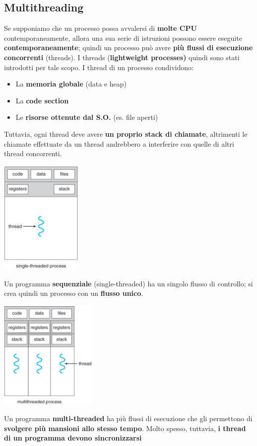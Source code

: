 \documentclass[12pt]{article}
\begin{document}
\subsection{Multithreading}
Se supponiamo che un processo possa avvalersi di \textbf{molte CPU} contemporaneamente, allora una sua serie di istruzioni possono essere eseguite \textbf{contemporaneamente}; quindi un processo può avere \textbf{più flussi di esecuzione concorrenti} (threads). I threads (\textbf{lightweight processes)} quindi sono stati introdotti per tale scopo. I thread di un processo condividono:
\begin{itemize}
    \item La \textbf{memoria globale} (data e heap)
    \item La \textbf{code section}
    \item Le \textbf{risorse ottenute dal S.O.} (es. file aperti)
\end{itemize}
Tuttavia, ogni thread deve avere \textbf{un proprio stack di chiamate}, altrimenti le chiamate effettuate da un thread andrebbero a interferire con quelle di altri thread concorrenti.
\begin{center}
    \includegraphics[width = 0.30\textwidth]{Images/60.PNG}
\end{center}
Un programma \textbf{sequenziale} (single-threaded) ha un singolo flusso di controllo; si crea quindi un processo con un \textbf{flusso unico}.
\begin{center}
    \includegraphics[width = 0.35\textwidth]{Images/61.PNG}
\end{center}
Un programma \textbf{multi-threaded} ha più flussi di esecuzione che gli permettono di \textbf{svolgere più mansioni allo stesso tempo}. Molto spesso, tuttavia, \textbf{i thread di un programma devono sincronizzarsi}
\end{document}
